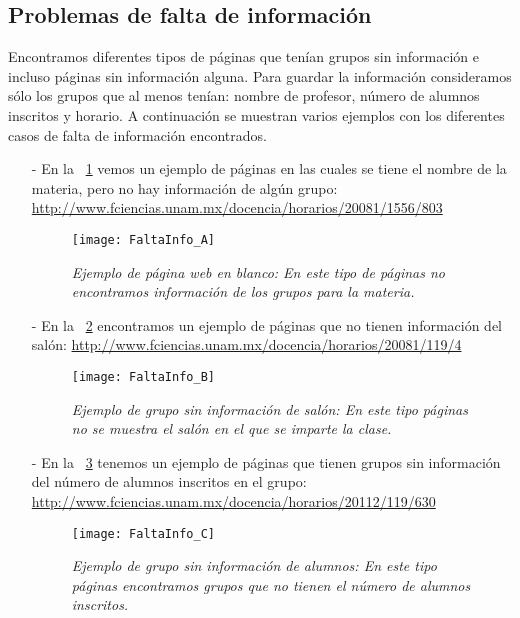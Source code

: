\subsection{Problemas de falta de información}

Encontramos diferentes tipos de páginas que tenían grupos sin información e incluso páginas sin información alguna. Para guardar la información consideramos sólo los grupos que al menos tenían: nombre de profesor, número de alumnos inscritos y horario. A continuación se muestran varios ejemplos con los diferentes casos de falta de información encontrados.


\begin{itemize}
\item[-] En la \figurename{~\ref{pagEnBlanco}} vemos un ejemplo de páginas en las cuales se tiene el nombre de la materia, pero no hay información de algún grupo: \url{http://www.fciencias.unam.mx/docencia/horarios/20081/1556/803}

\begin{figure}[H]
\centering
\texttt{[image: FaltaInfo\_A]} %
\caption[\textit{Ejemplo de página web en blanco}]{\textit{Ejemplo de página web en blanco: En este tipo de páginas no encontramos información de los grupos para la materia.}}\label{pagEnBlanco}
\end{figure}

\item[-] En la \figurename{~\ref{GpoSinInfo}} encontramos un ejemplo de páginas que no tienen información del salón: \url{http://www.fciencias.unam.mx/docencia/horarios/20081/119/4}

\begin{figure}[H]
\centering
\texttt{[image: FaltaInfo\_B]} %
\caption[\textit{Ejemplo de grupo sin información de salón}]{\textit{Ejemplo de grupo sin información de salón: En este tipo páginas no se muestra el salón en el que se imparte la clase.}}\label{GpoSinInfo}
\end{figure}

\item[-] En la \figurename{~\ref{GpoSinAlumnos}} tenemos un ejemplo de páginas que tienen grupos sin información del número de alumnos inscritos en el grupo: \url{http://www.fciencias.unam.mx/docencia/horarios/20112/119/630}

\begin{figure}[H]
\centering
\texttt{[image: FaltaInfo\_C]} %
\caption[\textit{Ejemplo de grupo sin información de alumnos}]{\textit{Ejemplo de grupo sin información de alumnos: En este tipo páginas encontramos grupos que no tienen el número de alumnos inscritos.}}\label{GpoSinAlumnos}
\end{figure}


\end{itemize}
